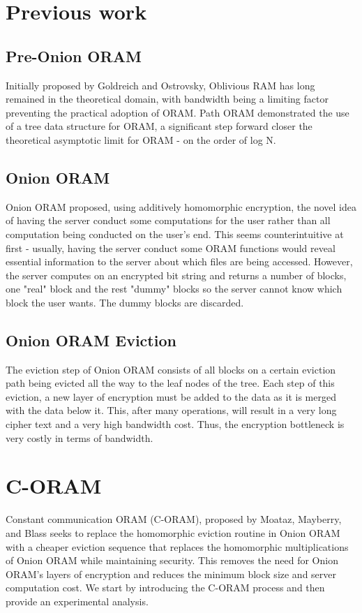 \documentclass[12pt, oneside]{amsart}   	%
\begin{document}
\section{Previous work}

\subsection{Pre-Onion ORAM}
Initially proposed by Goldreich and Ostrovsky, Oblivious RAM has long remained in the theoretical domain, with bandwidth being a limiting factor preventing the practical adoption of ORAM. Path ORAM demonstrated the use of a tree data structure for ORAM, a significant step forward closer the theoretical asymptotic limit for ORAM - on the order of log N.

\subsection{Onion ORAM}
Onion ORAM proposed, using additively homomorphic encryption, the novel idea of having the server conduct some computations for the user rather than all computation being conducted on the user's end. This seems counterintuitive at first - usually, having the server conduct some ORAM functions would reveal essential information to the server about which files are being accessed. However, the server computes on an encrypted bit string and returns a number of blocks, one "real" block and the rest "dummy" blocks so the server cannot know which block the user wants. The dummy blocks are discarded.

\subsection{Onion ORAM Eviction}
The eviction step of Onion ORAM consists of all blocks on a certain eviction path being evicted all the way to the leaf nodes of the tree. Each step of this eviction, a new layer of encryption must be added to the data as it is merged with the data below it. This, after many operations, will result in a very long cipher text and a very high bandwidth cost. Thus, the encryption bottleneck is very costly in terms of bandwidth.

\section{C-ORAM}
Constant communication ORAM (C-ORAM), proposed by Moataz, Mayberry, and Blass seeks to replace the homomorphic eviction routine in Onion ORAM with a cheaper eviction sequence that replaces the homomorphic multiplications of Onion ORAM while maintaining security. This removes the need for Onion ORAM's layers of encryption and reduces the minimum block size and server computation cost. We start by introducing the C-ORAM process and then provide an experimental analysis.
\end{document}
